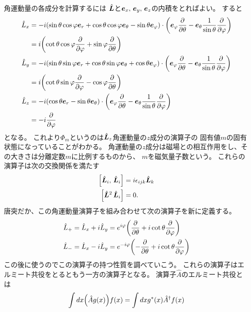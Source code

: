 \documentclass[../../master.tex]{subfiles}
\begin{document}
角運動量の各成分を計算するには
\(\hat{\vb*{L}}\)と\(\vb*{e}_x,\,\vb*{e}_y,\,\vb*{e}_z\)の内積をとればよい。
すると
\begin{align}
	\hat{L}_x
	 & = -i(\sin\theta\cos\varphi \vb*{e}_r + \cos\theta\cos\varphi \vb*{e}_\theta - \sin\theta \vb*{e}_\varphi) \cdot
	\qty(\vb*{e}_{\varphi}\pdv{\theta}-\vb*{e}_{\theta}\frac{1}{\sin\theta}\pdv{\varphi}) \notag                       \\
	 & = i\qty(\cot\theta\cos\varphi\pdv{\varphi}+\sin\varphi\pdv{\theta})                                             \\
	\hat{L}_y
	 & = -i(\sin\theta\sin\varphi \vb*{e}_r + \cos\theta\sin\varphi \vb*{e}_\theta + \cos\theta \vb*{e}_\varphi) \cdot
	\qty(\vb*{e}_{\varphi}\pdv{\theta}-\vb*{e}_{\theta}\frac{1}{\sin\theta}\pdv{\varphi}) \notag                       \\
	 & = i\qty(\cot\theta\sin\varphi\pdv{\varphi}-\cos\varphi\pdv{\theta})                                             \\
	\hat{L}_z
	 & = -i(\cos\theta\vb*{e}_r -\sin\theta\vb*{e}_\theta) \cdot
	\qty(\vb*{e}_{\varphi}\pdv{\theta}-\vb*{e}_{\theta}\frac{1}{\sin\theta}\pdv{\varphi}) \notag                       \\
	 & = -i\pdv{\varphi}
\end{align}
となる。
これより\(\Phi_m\)というのは\(\hat{\vb*{L}}_z\)角運動量の\(z\)成分の演算子の
固有値\(m\)の固有状態になっていることがわかる。
角運動量の\(z\)成分は磁場との相互作用をし、その大きさは分離定数\(m\)に比例するものから、
\(m\)を磁気量子数という。
これらの演算子は次の交換関係を満たす
\begin{align}
	\qty[\hat{\vb*{L}}_i,\,\hat{\vb*{L}}_i] & = i\epsilon_{ijk}\hat{\vb*{L}}_k \\
	\qty[\hat{\vb*{L}}^2\,\hat{\vb*{L}}_i]  & =0.
\end{align}
唐突だか、この角運動量演算子を組み合わせて次の演算子を新に定義する。
\begin{align}
	\hat{L}_+ & = \hat{L}_x + i\hat{L}_y = e^{ i\varphi}\qty( \pdv{\theta} +i\cot\theta\pdv{\varphi}) \\
	\hat{L}_- & = \hat{L}_x - i\hat{L}_y = e^{-i\varphi}\qty(-\pdv{\theta} +i\cot\theta\pdv{\varphi})
\end{align}
この後に使うのでこの演算子の持つ性質を調べていこう。
これらの演算子はエルミート共役をとるともう一方の演算子となる。
演算子\(\hat{A}\)のエルミート共役とは
\begin{equation}
	\int dx \qty(\hat{A}g(x)) f(x) = \int dx g^*(x) \hat{A}^\dag f(x)
\end{equation}
\end{document}
